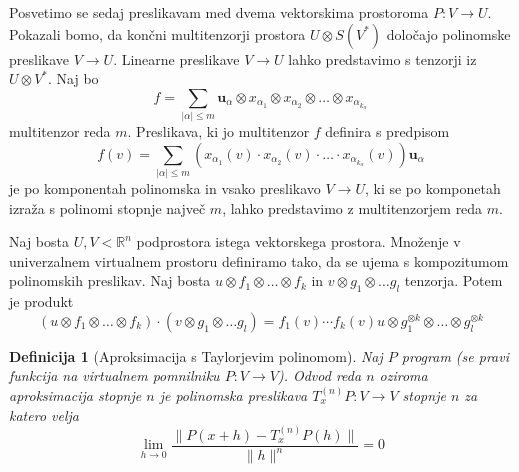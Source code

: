 \documentclass{article}
\newcommand{\RR}{\mathbb{R}}
\newcommand{\uu}{\mathbf{u}}
\newtheorem{definicija}{Definicija}[section]
\begin{document}
Posvetimo se sedaj preslikavam med dvema vektorskima prostoroma $P:V\to U$.
Pokazali bomo, da končni multitenzorji prostora $U\otimes S(V^*)$ določajo
polinomske preslikave $V\to U$. Linearne preslikave $V\to U$ lahko predstavimo s
tenzorji iz $U\otimes V^*$. Naj bo 
$$f=\sum_{|\alpha|\le m}\uu_\alpha\otimes x_{\alpha_1}\otimes x_{\alpha_2}\otimes
\ldots \otimes x_{\alpha_{k_\alpha}}$$ multitenzor reda $m$. Preslikava, ki jo
multitenzor $f$ definira s predpisom 
$$f(v) = \sum_{|\alpha|\le m}\left( x_{\alpha_1}(v)\cdot x_{\alpha_2}(v)\cdot
\ldots \cdot x_{\alpha_{k_\alpha}}(v) \right)\uu_\alpha$$
je po komponentah polinomska in vsako preslikavo $V\to U$, ki se po komponetah izraža s
polinomi stopnje največ $m$, lahko predstavimo z multitenzorjem reda $m$.
  

Naj bosta $U, V < \RR^n$ podprostora istega vektorskega prostora. Množenje v
univerzalnem virtualnem prostoru definiramo tako, da se ujema s kompozitumom
polinomskih preslikav. Naj bosta $u\otimes f_1\otimes\ldots \otimes f_k$ in
$v\otimes g_1\otimes \ldots g_l$ tenzorja. Potem je produkt
\begin{equation}
  \label{eq:produkt}
 \left( u\otimes f_1\otimes\ldots \otimes f_k \right)\cdot \left(v\otimes g_1\otimes \ldots g_l\right) = f_1(v)\cdots f_k(v) u\otimes g_1^{\otimes k}\otimes \ldots \otimes g_l^{\otimes k}
\end{equation}

\begin{definicija}[Aproksimacija s Taylorjevim polinomom]
Naj $P$ program (se pravi funkcija na virtualnem pomnilniku $P:V\to V$). Odvod
reda $n$ oziroma aproksimacija stopnje $n$ je polinomska preslikava
$T^{(n)}_xP:V\to V$ stopnje $n$ za katero velja
\begin{equation}
  \label{eq:aprox}
  \lim_{h\to 0}\frac{\|P(x+h)-T^{(n)}_xP(h)\|}{\|h\|^n}=0
\end{equation}
\end{definicija}
\end{document}
